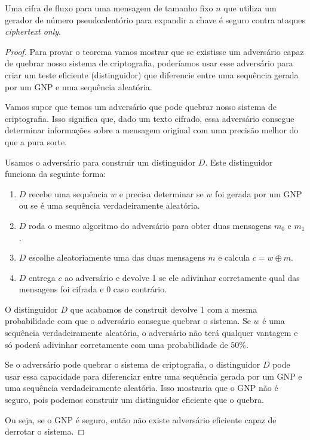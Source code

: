 \begin{theorem}
  \label{theo:stream}
  Uma cifra de fluxo para uma mensagem de tamanho fixo $n$ que utiliza um gerador de número pseudoaleatório para expandir a chave é seguro contra ataques {\em ciphertext only}.
\end{theorem}
\begin{proof}
Para provar o teorema vamos mostrar que se existisse um adversário capaz de quebrar nosso sistema de criptografia, poderíamos usar esse adversário para criar um teste eficiente (distinguidor) que diferencie entre uma sequência gerada por um GNP e uma sequência aleatória.

Vamos supor que temos um adversário que pode quebrar nosso sistema de criptografia.
Isso significa que, dado um texto cifrado, essa adversário consegue determinar informações sobre a mensagem original com uma precisão melhor do que a pura sorte.

Usamos o adversário para construir um distinguidor $D$.
Este distinguidor funciona da seguinte forma:

\begin{enumerate}
  \item $D$ recebe uma sequência $w$ e precisa determinar se $w$ foi gerada por um GNP ou se é uma sequência verdadeiramente aleatória.
  \item $D$ roda o mesmo algoritmo do adversário para obter duas mensagens $m_0$ e $m_1$.
  \item $D$ escolhe aleatoriamente uma das duas mensagens $m$ e calcula $c = w \oplus m$.
  \item $D$ entrega $c$ ao adversário e devolve 1 se ele adivinhar corretamente qual das mensagens foi cifrada e 0 caso contrário.
\end{enumerate}

O distinguidor $D$ que acabamos de construit devolve 1 com a mesma probabilidade com que o adversário consegue quebrar o sistema.
Se $w$ é uma sequência verdadeiramente aleatória, o adversário não terá qualquer vantagem e só poderá adivinhar corretamente com uma probabilidade de $50\%$.

Se o adversário pode quebrar o sistema de criptografia, o distinguidor $D$ pode usar essa capacidade para diferenciar entre uma sequência gerada por um GNP e uma sequência verdadeiramente aleatória.
Isso mostraria que o GNP não é seguro, pois podemos construir um distinguidor eficiente que o quebra.

Ou seja, se o GNP é seguro, então não existe adversário eficiente capaz de derrotar o sistema.
\end{proof}

